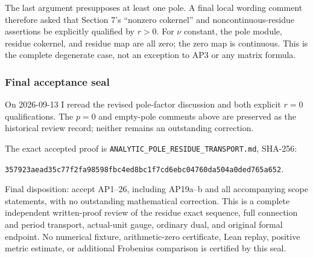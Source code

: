 The last argument presupposes at least one pole. A final local wording comment therefore asked that Section 7's ``nonzero cokernel'' and noncontinuous-residue assertions be explicitly qualified by \(r>0\). For \(\nu\) constant, the pole module, residue cokernel, and residue map are all zero; the zero map is continuous. This is the complete degenerate case, not an exception to AP3 or any matrix formula.

\subsubsection{Final acceptance seal}\label{endpoint-analytic_pole_review--final-acceptance-seal}

On 2026-09-13 I reread the revised pole-factor discussion and both explicit \(r=0\) qualifications. The \(p=0\) and empty-pole comments above are preserved as the historical review record; neither remains an outstanding correction.

The exact accepted proof is \nolinkurl{ANALYTIC_POLE_RESIDUE_TRANSPORT.md}, SHA-256:

\nolinkurl{357923aead35c77f2fa98598fbc4ed8bc1f7cd6ebc04760da504a0ded765a652}.

Final disposition: accept AP1--26, including AP19a--b and all accompanying scope statements, with no outstanding mathematical correction. This is a complete independent written-proof review of the residue exact sequence, full connection and period transport, actual-unit gauge, ordinary dual, and original formal endpoint. No numerical fixture, arithmetic-zero certificate, Lean replay, positive metric estimate, or additional Frobenius comparison is certified by this seal.

\endgroup


\endgroup

